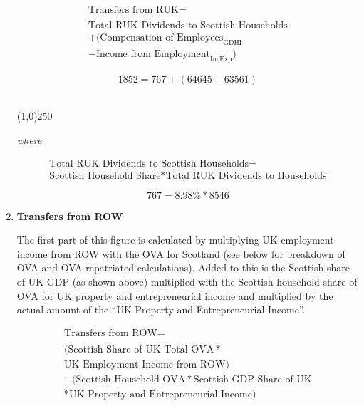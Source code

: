 \begin{enumerate}
\begin{equation}
\begin{split}
\text{Transfers from RUK} =  \\ \\
\text{Total RUK Dividends to Scottish Households}\\
+(\text{Compensation of Employees}_\text{GDHI}\\
-\text{Income from Employment}_\text{IncExp})
\end{split} \label{eq:2.5.9}
\end{equation}

\begin{equation} \nonumber
1852 = 767+(64645-63561)
\end{equation}\\

\begin{center}
\line(1,0){250}
\end{center}

\textit{where}

\begin{equation}
\begin{split}
\text{Total RUK Dividends to Scottish Households}=\\
\text{Scottish Household Share}*\text{Total RUK Dividends to Households}
\end{split} \label{eq:2.5.10}
\end{equation}

\begin{equation}\nonumber
767=8.98\%*8546
\end{equation}


\item \textbf {Transfers from ROW}

The first part of this figure is calculated by multiplying UK employment income from ROW with the OVA for Scotland (see below for breakdown of OVA and OVA repatriated calculations). Added to this is the Scottish share of UK GDP (as shown above) multiplied with the Scottish household share of OVA for UK property and entrepreneurial income and multiplied by the actual amount of the ``UK Property and Entrepreneurial Income''. \cite{ScotGov2013a,ONS2011c,ScotGov2013b}

\begin{equation}
\begin{split}
\text{Transfers from ROW} =  \\ \\
(\text{Scottish Share of UK Total OVA}*\\
\text{UK Employment Income from ROW})\\
+(\text{Scottish Household OVA}*\text{Scottish GDP Share of UK}\\
*\text{UK Property and Entrepreneurial Income})
\end{split} \label{eq:2.5.11}
\end{equation}



\end{enumerate}
